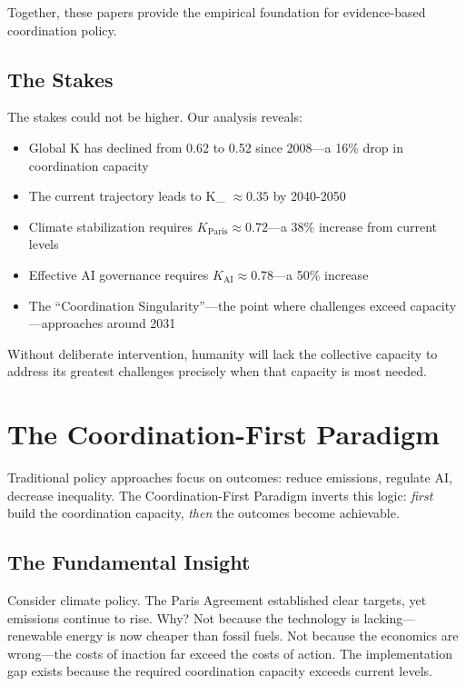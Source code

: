 \documentclass[12pt,letterpaper]{article}
\newcommand{\Kc}{K_{\text{crit}}}
\newcommand{\Kai}{K_{\text{AI}}}
\newcommand{\Kparis}{K_{\text{Paris}}}
\begin{document}
Together, these papers provide the empirical foundation for evidence-based coordination policy.

\subsection{The Stakes}

The stakes could not be higher. Our analysis reveals:

\begin{itemize}
    \item Global K has declined from 0.62 to 0.52 since 2008---a 16\% drop in coordination capacity
    \item The current trajectory leads to \Kc{} $\approx 0.35$ by 2040-2050
    \item Climate stabilization requires $\Kparis \approx 0.72$---a 38\% increase from current levels
    \item Effective AI governance requires $\Kai \approx 0.78$---a 50\% increase
    \item The ``Coordination Singularity''---the point where challenges exceed capacity---approaches around 2031
\end{itemize}

Without deliberate intervention, humanity will lack the collective capacity to address its greatest challenges precisely when that capacity is most needed.

\section{The Coordination-First Paradigm}

Traditional policy approaches focus on outcomes: reduce emissions, regulate AI, decrease inequality. The Coordination-First Paradigm inverts this logic: \textit{first} build the coordination capacity, \textit{then} the outcomes become achievable.

\subsection{The Fundamental Insight}

Consider climate policy. The Paris Agreement established clear targets, yet emissions continue to rise. Why? Not because the technology is lacking---renewable energy is now cheaper than fossil fuels. Not because the economics are wrong---the costs of inaction far exceed the costs of action. The implementation gap exists because the required coordination capacity exceeds current levels.
\end{document}
